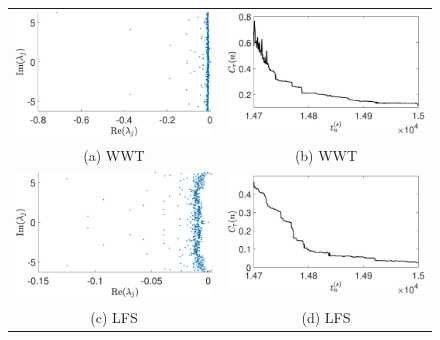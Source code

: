 \documentclass[a4paper,11pt]{article}
\begin{document}
\begin{figure}[!ht]
\centering
\begin{tabular}{cc}
\includegraphics[width=.525\textwidth]{full_spec_wwt_K_128_Lx_128_tf_1_pt5e4} &\hspace{-25pt} \includegraphics[width=.525\textwidth]{cratio_wwt_K_128_Lx_128_tf_1pt5e4}\\
(a) WWT & (b) WWT\\
\includegraphics[width=.525\textwidth]{full_spec_lf_K_128_Lx_128_tf_1_pt5e4} &\hspace{-25pt} \includegraphics[width=.525\textwidth]{cratio_lfforce_K_128_Lx_128_tf_1pt5e4}\\
(c) LFS & (d) LFS\\

\end{tabular}
\end{figure}
\end{document}
